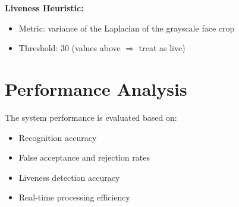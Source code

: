 \documentclass[11pt]{report}
\begin{document}
\textbf{Liveness Heuristic:}
\begin{itemize}
    \item Metric: variance of the Laplacian of the grayscale face crop
    \item Threshold: 30 (values above $\Rightarrow$ treat as live)
\end{itemize}

\section{Performance Analysis}

The system performance is evaluated based on:

\begin{itemize}
    \item Recognition accuracy
    \item False acceptance and rejection rates
    \item Liveness detection accuracy
    \item Real-time processing efficiency
\end{itemize}
\end{document}
